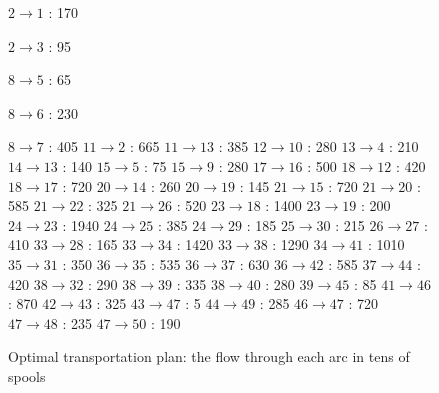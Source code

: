 \begin{figure}[H]
\centering
\begin{multicols}{5}
$ 2 \rightarrow 1 $ : 170

$ 2 \rightarrow 3 $ : 95

$ 8 \rightarrow 5 $ : 65

$ 8 \rightarrow 6 $ : 230

$ 8 \rightarrow 7 $ : 405
$ 11 \rightarrow 2 $ : 665
$ 11 \rightarrow 13 $ : 385
$ 12 \rightarrow 10 $ : 280
$ 13 \rightarrow 4 $ : 210
$ 14 \rightarrow 13 $ : 140
$ 15 \rightarrow 5 $ : 75
$ 15 \rightarrow 9 $ : 280
$ 17 \rightarrow 16 $ : 500
$ 18 \rightarrow 12 $ : 420
$ 18 \rightarrow 17 $ : 720
$ 20 \rightarrow 14 $ : 260
$ 20 \rightarrow 19 $ : 145
$ 21 \rightarrow 15 $ : 720
$ 21 \rightarrow 20 $ : 585
$ 21 \rightarrow 22 $ : 325
$ 21 \rightarrow 26 $ : 520
$ 23 \rightarrow 18 $ : 1400
$ 23 \rightarrow 19 $ : 200
$ 24 \rightarrow 23 $ : 1940
$ 24 \rightarrow 25 $ : 385
$ 24 \rightarrow 29 $ : 185
$ 25 \rightarrow 30 $ : 215
$ 26 \rightarrow 27 $ : 410
$ 33 \rightarrow 28 $ : 165
$ 33 \rightarrow 34 $ : 1420
$ 33 \rightarrow 38 $ : 1290
$ 34 \rightarrow 41 $ : 1010
$ 35 \rightarrow 31 $ : 350
$ 36 \rightarrow 35 $ : 535
$ 36 \rightarrow 37 $ : 630
$ 36 \rightarrow 42 $ : 585
$ 37 \rightarrow 44 $ : 420
$ 38 \rightarrow 32 $ : 290
$ 38 \rightarrow 39 $ : 335
$ 38 \rightarrow 40 $ : 280
$ 39 \rightarrow 45 $ : 85
$ 41 \rightarrow 46 $ : 870
$ 42 \rightarrow 43 $ : 325
$ 43 \rightarrow 47 $ : 5
$ 44 \rightarrow 49 $ : 285
$ 46 \rightarrow 47 $ : 720
$ 47 \rightarrow 48 $ : 235
$ 47 \rightarrow 50 $ : 190
\end{multicols}
\caption{Optimal transportation plan: the flow through each arc in tens of spools}
\label{flow3-1a}
\end{figure}

